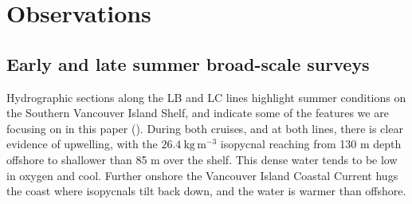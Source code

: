 \documentclass[draft]{agujournal2019}
\begin{document}
\section{Observations}
\label{sec:Observations}

\subsection{Early and late summer broad-scale surveys}

Hydrographic sections along the LB and LC lines highlight summer conditions on the Southern Vancouver Island Shelf, and indicate some of the features we are focusing on in this paper ().  During both cruises, and at both lines, there is clear evidence of upwelling, with the $26.4\ \mathrm{kg\,m^{-3}}$ isopycnal reaching from 130 m depth offshore to shallower than 85 m over the shelf.  This dense water tends to be low in oxygen and cool. Further onshore the Vancouver Island Coastal Current hugs the coast where isopycnals tilt back down, and the water is warmer than offshore.
\end{document}
